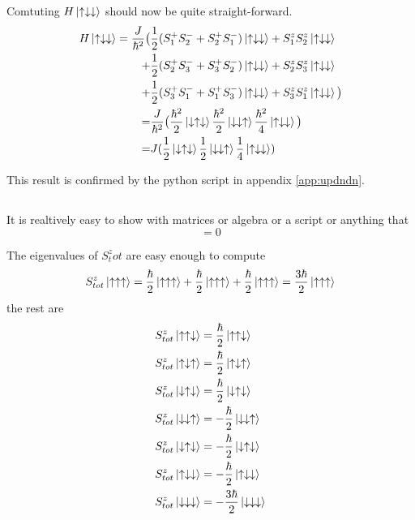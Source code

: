 \documentclass{article}
\begin{document}
Comtuting $H\ket{\uparrow\downarrow\downarrow}$ should now be quite straight-forward.
\begin{align*}
H\ket{\uparrow\downarrow\downarrow} = 
\frac{J}{\hbar^2} \big(&\frac{1}{2} (S_1^+S_2^- + S_2^+S_1^-)\ket{\uparrow\downarrow\downarrow} + S_1^zS_2^z\ket{\uparrow\downarrow\downarrow} \\
+&\frac{1}{2}(S_2^+S_3^- + S_3^+S_2^-)\ket{\uparrow\downarrow\downarrow} + S_2^zS_3^z\ket{\uparrow\downarrow\downarrow} \\
+&\frac{1}{2}(S_3^+S_1^- + S_1^+S_3^-)\ket{\uparrow\downarrow\downarrow} + S_3^zS_1^z\ket{\uparrow\downarrow\downarrow} \big)\\
=&\frac{J}{\hbar^2}\big(
\frac{\hbar^2}{2}\ket{\downarrow\uparrow\downarrow} 
\frac{\hbar^2}{2}\ket{\downarrow\downarrow\uparrow} 
\frac{\hbar^2}{4}\ket{\uparrow\downarrow\downarrow} 
\big) \\
=&J(
\frac{1}{2}\ket{\downarrow\uparrow\downarrow} 
\frac{1}{2}\ket{\downarrow\downarrow\uparrow} 
\frac{1}{4}\ket{\uparrow\downarrow\downarrow})
\end{align*}

This result is confirmed by the python script in appendix \ref{app:updndn}.

\subsection{}
It is realtively easy to show with matrices or algebra or a script or anything that
\begin{equation}
[H,S^z_{tot}]=0
\end{equation}

The eigenvalues of $S^z_tot$ are easy enough to compute
\begin{equation*}
S^z_{tot}\ket{\uparrow\uparrow\uparrow}=\frac{\hbar}{2}\ket{\uparrow\uparrow\uparrow}+\frac{\hbar}{2}\ket{\uparrow\uparrow\uparrow} + \frac{\hbar}{2}\ket{\uparrow\uparrow\uparrow} = \frac{3\hbar}{2}\ket{\uparrow\uparrow\uparrow}
\end{equation*}
the rest are
\begin{align*}
S^z_{tot}\ket{\uparrow\uparrow\downarrow}&=\frac{\hbar}{2}\ket{\uparrow\uparrow\downarrow} \\
S^z_{tot}\ket{\uparrow\downarrow\uparrow}&=\frac{\hbar}{2}\ket{\uparrow\downarrow\uparrow} \\
S^z_{tot}\ket{\downarrow\uparrow\downarrow}&=\frac{\hbar}{2}\ket{\downarrow\uparrow\downarrow} \\
S^z_{tot}\ket{\downarrow\downarrow\uparrow}&=-\frac{\hbar}{2}\ket{\downarrow\downarrow\uparrow} \\
S^z_{tot}\ket{\downarrow\uparrow\downarrow}&=-\frac{\hbar}{2}\ket{\downarrow\uparrow\downarrow} \\
S^z_{tot}\ket{\uparrow\downarrow\downarrow}&=-\frac{\hbar}{2}\ket{\uparrow\downarrow\downarrow} \\
S^z_{tot}\ket{\downarrow\downarrow\downarrow}&=-\frac{3\hbar}{2}\ket{\downarrow\downarrow\downarrow} 
\end{align*}
\end{document}
